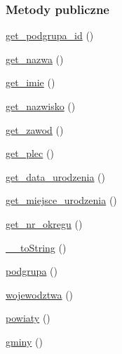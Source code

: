 \subsubsection*{Metody publiczne}
\begin{DoxyCompactItemize}
\item 
\hyperlink{classep___b_d_l___wskaznik___wariacja_add21f4eeab439ee12da5a0429fdc1e04}{get\-\_\-podgrupa\-\_\-id} ()
\item 
\hyperlink{classep___b_d_l___wskaznik___wariacja_ac0818f0049d7b84f08f77128f54cee36}{get\-\_\-nazwa} ()
\item 
\hyperlink{classep___b_d_l___wskaznik___wariacja_ac4b0c85dc2a130038f2d118dbd0c3d77}{get\-\_\-imie} ()
\item 
\hyperlink{classep___b_d_l___wskaznik___wariacja_abdd1d7ff92508da7f748ba1feec97af0}{get\-\_\-nazwisko} ()
\item 
\hyperlink{classep___b_d_l___wskaznik___wariacja_af80ca8310b60004454dd02a387deaa2c}{get\-\_\-zawod} ()
\item 
\hyperlink{classep___b_d_l___wskaznik___wariacja_ac7f9af5c3fa024e4c26a7b6bd4ce4bb4}{get\-\_\-plec} ()
\item 
\hyperlink{classep___b_d_l___wskaznik___wariacja_a880b240cd2d8c336fd1709bf0cb1ae2c}{get\-\_\-data\-\_\-urodzenia} ()
\item 
\hyperlink{classep___b_d_l___wskaznik___wariacja_ac57c08ec5e394a19c5bd9280c8376182}{get\-\_\-miejsce\-\_\-urodzenia} ()
\item 
\hyperlink{classep___b_d_l___wskaznik___wariacja_a2645a9f0aa5b0ccc482943348c033d0a}{get\-\_\-nr\-\_\-okregu} ()
\item 
\hyperlink{classep___b_d_l___wskaznik___wariacja_a7516ca30af0db3cdbf9a7739b48ce91d}{\-\_\-\-\_\-to\-String} ()
\item 
\hyperlink{classep___b_d_l___wskaznik___wariacja_a6c73717d6fab642c6d5f3c5961724180}{podgrupa} ()
\item 
\hyperlink{classep___b_d_l___wskaznik___wariacja_acb04fcd1fcf58babff11d13c0b03d053}{wojewodztwa} ()
\item 
\hyperlink{classep___b_d_l___wskaznik___wariacja_a1fb07b52f2e231d447866762258ab070}{powiaty} ()
\item 
\hyperlink{classep___b_d_l___wskaznik___wariacja_a885f04b428d85dab7d92552ae9dba979}{gminy} ()
\end{DoxyCompactItemize}
